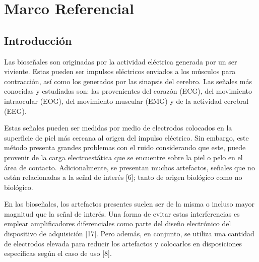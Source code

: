 \chapter{Marco Referencial}
\section{Introducción}
\label{sec:org49b042a}
Las bioseñales son originadas por la actividad eléctrica generada por un ser viviente. Estas pueden ser impulsos eléctricos enviados a los músculos para contracción, así como los generados por las sinapsis del cerebro. Las señales más conocidas y estudiadas son: las  provenientes del corazón (ECG), del movimiento intraocular (EOG), del movimiento muscular (EMG) y de la actividad cerebral (EEG). 

Estas señales pueden ser medidas por medio de electrodos colocados en la superficie de piel más cercana al origen del impulso eléctrico. Sin embargo, este método presenta grandes problemas con el ruido considerando que este, puede provenir de la carga electroestática que se encuentre sobre la piel o pelo en el área de contacto. Adicionalmente, se presentan muchos artefactos, señales que no están relacionadas a la señal de interés [6]; tanto de origen biológico como no biológico.

En las bioseñales, los artefactos presentes suelen ser de la misma o incluso mayor magnitud que la señal de interés. Una forma de evitar estas interferencias es emplear amplificadores diferenciales como parte del diseño electrónico del dispositivo de adquisición [17]. Pero además, en conjunto, se utiliza una cantidad de electrodos elevada para reducir los artefactos y colocarlos en disposiciones específicas según el caso de uso [8].

